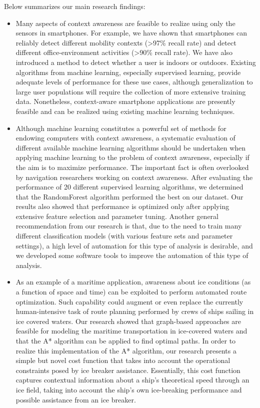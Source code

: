 Below summarizes our main research findings:
%
\begin{itemize}
\item Many aspects of context awareness are feasible to realize using only the sensors in smartphones. For example, we have shown that smartphones can reliably detect different mobility contexts (\textgreater97\% recall rate) and detect different office-environment activities (\textgreater90\% recall rate). We have also introduced a method to detect whether a user is indoors or outdoors. Existing algorithms from machine learning, especially supervised learning, provide adequate levels of performance for these use cases, although generalization to large user populations will require the collection of more extensive training data. Nonetheless, context-aware smartphone applications are presently feasible and can be realized using existing machine learning techniques.
%
\item Although machine learning constitutes a powerful set of methods for endowing computers with context awareness, a systematic evaluation of different available machine learning algorithms should be undertaken when applying machine learning to the problem of context awareness, especially if the aim is to maximize performance. The important fact is often overlooked by navigation researchers working on context awareness. After evaluating the performance of 20 different supervised learning algorithms, we determined that the RandomForest algorithm performed the best on our dataset. Our results also showed that performance is optimized only after applying extensive feature selection and parameter tuning. Another general recommendation from our research is that, due to the need to train many different classification models (with various feature sets and parameter settings), a high level of automation for this type of analysis is desirable, and we developed some software tools to improve the automation of this type of analysis.
%
\item As an example of a maritime application, awareness about ice conditions (as a function of space and time) can be exploited to perform automated route optimization. Such capability could augment or even replace the currently human-intensive task of route planning performed by crews of ships sailing in ice covered waters. Our research showed that graph-based approaches are feasible for modeling the maritime transportation in ice-covered waters and that the A* algorithm can be applied to find optimal paths. In order to realize this implementation of the A* algorithm, our research presents a simple but novel cost function that takes into account the operational constraints posed by ice breaker assistance. Essentially, this cost function captures contextual information about a ship's theoretical speed through an ice field, taking into account the ship's own ice-breaking performance and possible assistance from an ice breaker.

\end{itemize}
